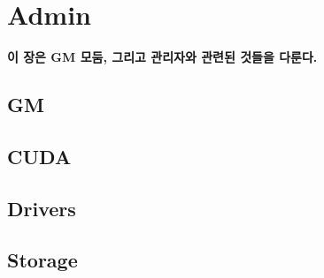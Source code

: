 
\graphicspath{{./chap6/images/}}  
\chapter{Admin}
\textbf{이 장은 GM 모둠, 그리고 관리자와 관련된 것들을 다룬다.}

\section{GM}
\section{CUDA}
\section{Drivers}
\section{Storage}
